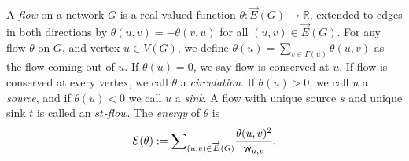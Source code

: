 \documentclass{theoretics}
\renewcommand{\>}{\rangle}
\newcommand{\<}{\langle}
\renewcommand{\(}{\left(}
\renewcommand{\)}{\right)}
\def\w{{\sf w}}
\begin{document}
\begin{definition}\label{def:flow}
A \emph{flow} on a network $G$ is a real-valued function $\theta:\overrightarrow{E}(G)\rightarrow\mathbb{R}$, extended to edges in both directions by $\theta(u,v)=-\theta(v,u)$ for all $(u,v)\in\overrightarrow{E}(G)$. 
For any flow $\theta$ on $G$, and vertex $u\in V(G)$, we define $\theta(u)=\sum_{v\in \Gamma(u)}\theta(u,v)$ as the flow coming out of $u$. If $\theta(u)=0$, we say flow is conserved at $u$. If flow is conserved at every vertex, we call $\theta$ a \emph{circulation}. 
If $\theta(u)>0$, we call $u$ a \emph{source}, and if $\theta(u)<0$ we call $u$ a \emph{sink}. A flow with unique source $s$ and unique sink $t$ is called an \emph{$st$-flow}. 
The \emph{energy} of $\theta$ is 
$${\cal E}(\theta):=\textstyle{\displaystyle\sum}_{(u,v)\in\overrightarrow{E}(G)}\displaystyle\frac{\theta(u,v)^2}{\w_{u,v}}.$$
\end{definition}
\end{document}
